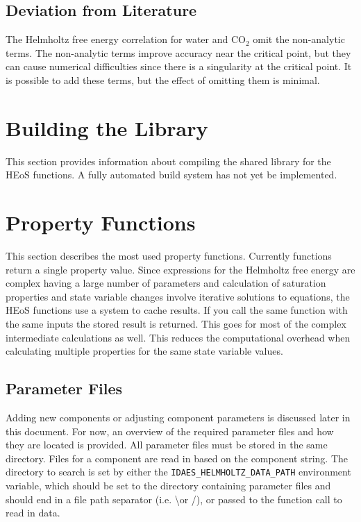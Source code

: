 \documentclass[oneside]{book}
\begin{document}
\section{Deviation from Literature}

The Helmholtz free energy correlation for water \cite{doi:10.1063/1.1461829} and CO$_2$ \cite{osti_402357} omit the non-analytic terms.  The non-analytic terms improve accuracy near the critical point, but they can cause numerical difficulties since there is a singularity at the critical point.  It is possible to add these terms, but the effect of omitting them is minimal.

\chapter{Building the Library}

This section provides information about compiling the shared library for the HEoS functions. A fully automated build system has not yet be implemented.


\chapter{Property Functions}

This section describes the most used property functions.  Currently functions return a single property value. Since expressions for the Helmholtz free energy are complex having a large number of parameters and calculation of saturation properties and state variable changes involve iterative solutions to equations, the HEoS functions use a system to cache results.  If you call the same function with the same inputs the stored result is returned.  This goes for most of the complex intermediate calculations as well.  This reduces the computational overhead when calculating multiple properties for the same state variable values.

\section{Parameter Files}

Adding new components or adjusting component parameters is discussed later in this document.  For now, an overview of the required parameter files and how they are located is provided.  All parameter files must be stored in the same directory.  Files for a component are read in based on the component string.  The directory to search is set by either the \texttt{IDAES\_HELMHOLTZ\_DATA\_PATH} environment variable, which should be set to the directory containing parameter files and should end in a file path separator (i.e. \textbackslash \hspace{1ex}or /), or passed to the function call to read in data.  
\end{document}
